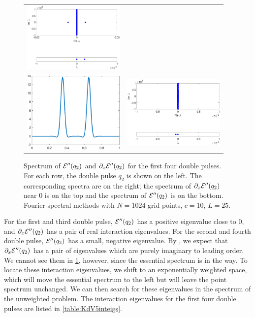 \documentclass[thesis2.tex]{subfiles}
\begin{document}
\begin{figure}
\begin{center}
\begin{tabular}{cc}
\includegraphics[width=5cm]{images/kdv5numerics/double3spec} \\
\includegraphics[width=5cm]{images/kdv5numerics/double4} &
\includegraphics[width=5cm]{images/kdv5numerics/double4spec} \\
\end{tabular}
\caption[Spectrum of double pulses for KdV5]{Spectrum of $\mathcal{E}''(q_2)$ and $\partial_x \mathcal{E}
''(q_2)$ for the first four double pulses. For each row, the double pulse $q_2$ is shown on the left. The corresponding spectra are on the right; the spectrum of $\partial_x \mathcal{E}''(q_2)$ near 0 is on the top and the spectrum of $\mathcal{E}''(q_2)$ is on the bottom. Fourier spectral methods with $N = 1024$ grid points, $c = 10$, $L = 25$.}
\label{fig:KdV5doublespec}
\end{center}
\end{figure}
For the first and third double pulse, $\mathcal{E}''(q_2)$ has a positive eigenvalue close to 0, and $\partial_x \mathcal{E}''(q_2)$ has a pair of real interaction eigenvalues. For the second and fourth double pulse, $\mathcal{E}''(q_2)$ has a small, negative eigenvalue. By \cite[Theorem 2.3]{Pelinovsky2007}, we expect that $\partial_x \mathcal{E}''(q_2)$ has a pair of eigenvalues which are purely imaginary to leading order. We cannot see them in \cref{fig:KdV5doublespec}, however, since the essential spectrum is in the way. To locate these interaction eigenvalues, we shift to an exponentially weighted space, which will move the essential spectrum to the left but will leave the point spectrum unchanged. We can then search for these eigenvalues in the spectrum of the unweighted problem. The interaction eigenvalues for the first four double pulses are listed in \cref{table:KdV5inteigs}.
\end{document}
